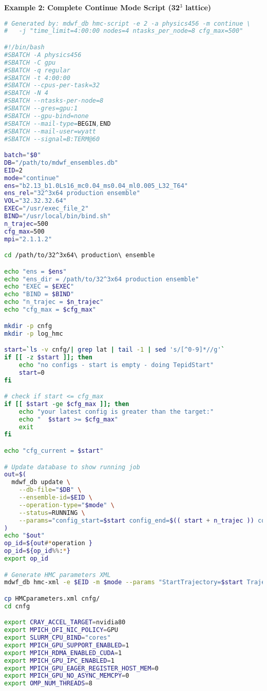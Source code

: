 \documentclass{article}
\begin{document}
\textbf{Example 2: Complete Continue Mode Script (32$^3$ lattice)}
\begin{lstlisting}[language=bash]
# Generated by: mdwf_db hmc-script -e 2 -a physics456 -m continue \
#   -j "time_limit=4:00:00 nodes=4 ntasks_per_node=8 cfg_max=500"

#!/bin/bash
#SBATCH -A physics456
#SBATCH -C gpu
#SBATCH -q regular
#SBATCH -t 4:00:00
#SBATCH --cpus-per-task=32
#SBATCH -N 4
#SBATCH --ntasks-per-node=8
#SBATCH --gres=gpu:1
#SBATCH --gpu-bind=none
#SBATCH --mail-type=BEGIN,END
#SBATCH --mail-user=wyatt
#SBATCH --signal=B:TERM@60

batch="$0"
DB="/path/to/mdwf_ensembles.db"
EID=2
mode="continue"
ens="b2.13_b1.0Ls16_mc0.04_ms0.04_ml0.005_L32_T64"
ens_rel="32^3x64 production ensemble"
VOL="32.32.32.64"
EXEC="/usr/exec_file_2"
BIND="/usr/local/bin/bind.sh"
n_trajec=500
cfg_max=500
mpi="2.1.1.2"

cd /path/to/32^3x64\ production\ ensemble

echo "ens = $ens"
echo "ens_dir = /path/to/32^3x64 production ensemble"
echo "EXEC = $EXEC"
echo "BIND = $BIND"
echo "n_trajec = $n_trajec"
echo "cfg_max = $cfg_max"

mkdir -p cnfg
mkdir -p log_hmc

start=`ls -v cnfg/| grep lat | tail -1 | sed 's/[^0-9]*//g'`
if [[ -z $start ]]; then
    echo "no configs - start is empty - doing TepidStart"
    start=0
fi

# check if start <= cfg_max
if [[ $start -ge $cfg_max ]]; then
    echo "your latest config is greater than the target:"
    echo "  $start >= $cfg_max"
    exit
fi

echo "cfg_current = $start"

# Update database to show running job
out=$(
  mdwf_db update \
    --db-file="$DB" \
    --ensemble-id=$EID \
    --operation-type="$mode" \
    --status=RUNNING \
    --params="config_start=$start config_end=$(( start + n_trajec )) config_increment=$n_trajec slurm_job=$SLURM_JOB_ID exec_path=$EXEC bind_script=$BIND"
)
echo "$out"
op_id=${out#*operation }
op_id=${op_id%%:*}
export op_id

# Generate HMC parameters XML
mdwf_db hmc-xml -e $EID -m $mode --params "StartTrajectory=$start Trajectories=$n_trajec"

cp HMCparameters.xml cnfg/
cd cnfg

export CRAY_ACCEL_TARGET=nvidia80
export MPICH_OFI_NIC_POLICY=GPU
export SLURM_CPU_BIND="cores"
export MPICH_GPU_SUPPORT_ENABLED=1
export MPICH_RDMA_ENABLED_CUDA=1
export MPICH_GPU_IPC_ENABLED=1
export MPICH_GPU_EAGER_REGISTER_HOST_MEM=0
export MPICH_GPU_NO_ASYNC_MEMCPY=0
export OMP_NUM_THREADS=8


\end{lstlisting}
\end{document}
